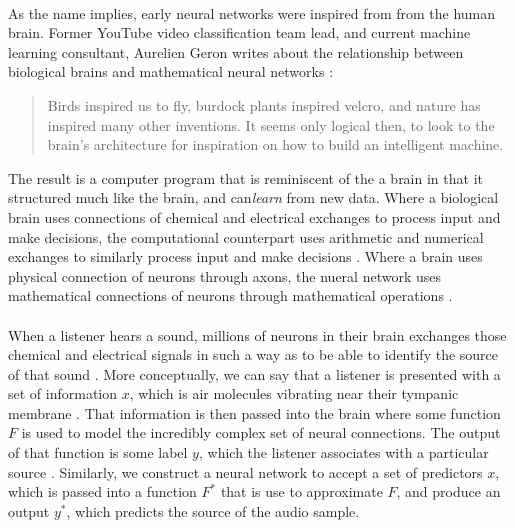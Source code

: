 \documentclass[12pt,letterpaper]{article}
\begin{document}
\paragraph*{}As the name implies, early neural networks were inspired from from the human brain. Former YouTube video classification team lead, and current machine learning consultant, Aurelien Geron writes about the relationship between biological brains and mathematical neural networks \cite{Geron}: 
\begin{quote}
Birds inspired us to fly, burdock plants inspired velcro, and nature has inspired many other inventions. It seems only logical then, to look to the brain's architecture for inspiration on how to build an intelligent machine.
\end{quote}
The result is a computer program that is reminiscent of the a brain in that it structured much like the brain, and can\textit{learn} from new data. Where a biological brain uses connections of chemical and electrical exchanges to process input and make decisions, the computational counterpart uses arithmetic and numerical exchanges to similarly process input and make decisions \cite{Levine,Bishop}. Where a brain uses physical connection of neurons through axons, the nueral network uses mathematical connections of neurons through mathematical operations \cite{Geron,Levine}.

\paragraph*{}When a listener hears a sound, millions of neurons in their brain exchanges those chemical and electrical signals in such a way as to be able to identify the source of that sound \cite{Geron,Virtanen}. More conceptually, we can say that a listener is presented with a set of information $x$, which is air molecules vibrating near their tympanic membrane \cite{White,Olson}. That information is then passed into the brain where some function $F$ is used to model the incredibly complex set of neural connections. The output of that function is some label $y$, which the listener associates with a particular source \cite{Olson}. Similarly, we construct a neural network to accept a set of predictors $x$, which is passed into a function $F^*$ that is use to approximate $F$, and produce an output $y^*$, which predicts the source of the audio sample.
\end{document}
